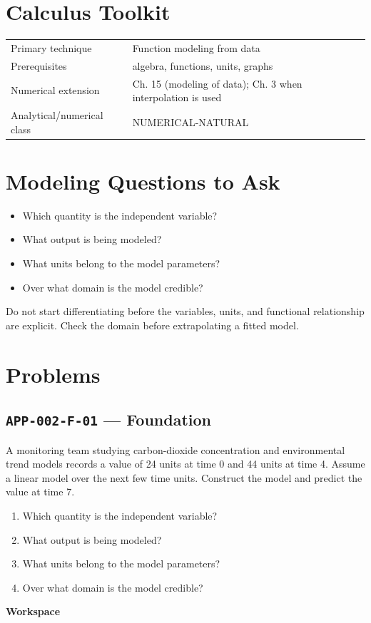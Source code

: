 \documentclass[11pt]{book}
\newcommand{\pid}[1]{\texttt{#1}}
\newcommand{\workspace}{\par\vspace{0.7in}\hrulefill\par\vspace{0.55in}\hrulefill\par}
\begin{document}
\section*{Calculus Toolkit}
\begin{tabularx}{\textwidth}{@{}lX@{}}\toprule
Primary technique & Function modeling from data \\
Prerequisites & algebra, functions, units, graphs \\
Numerical extension & Ch. 15 (modeling of data); Ch. 3 when interpolation is used \\
Analytical/numerical class & NUMERICAL-NATURAL \\
\bottomrule\end{tabularx}
\section*{Modeling Questions to Ask}\begin{itemize}
\item Which quantity is the independent variable?
\item What output is being modeled?
\item What units belong to the model parameters?
\item Over what domain is the model credible?
\end{itemize}
\begin{errorbox}Do not start differentiating before the variables, units, and functional relationship are explicit. Check the domain before extrapolating a fitted model.\end{errorbox}
\section*{Problems}
\subsection*{\pid{APP-002-F-01} — Foundation}
\begin{problembox}
A monitoring team studying carbon-dioxide concentration and environmental trend models records a value of 24 units at time 0 and 44 units at time 4. Assume a linear model over the next few time units. Construct the model and predict the value at time 7.
\end{problembox}
\begin{promptbox}\begin{enumerate}
\item Which quantity is the independent variable?
\item What output is being modeled?
\item What units belong to the model parameters?
\item Over what domain is the model credible?
\end{enumerate}\end{promptbox}
\textbf{Workspace}\workspace
{}
\end{document}
